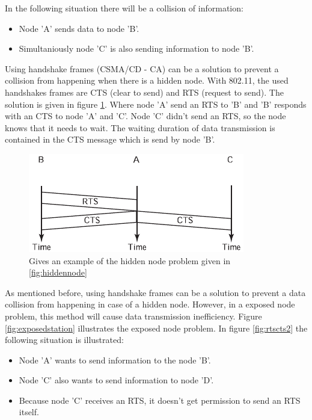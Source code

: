 \documentclass[10pt,a4paper]{article}
\begin{document}
In the following situation there will be a collision of information:
\begin{itemize}
\setlength\itemsep{0em}
\item Node 'A' sends data to node 'B'.
\item Simultaniously node 'C' is also sending information to node 'B'.
\end{itemize}

Using handshake frames (CSMA/CD - CA) can be a solution to prevent a collision from happening when there is a hidden node. With 802.11, the used handshakes frames are CTS (clear to send) and RTS (request to send). The solution is given in figure \ref{fig:rtscts}. Where node 'A' send an RTS to 'B' and 'B' responds with an CTS to node 'A' and 'C'. Node 'C' didn't send an RTS, so the node knows that it needs to wait. The waiting duration of data transmission is contained in the CTS message which is send by node 'B'. \cite{tcipbook}

\begin{figure}[H]
   \centering
   \includegraphics[width=.75\textwidth]{rtscts}
   \caption{Gives an example of the hidden node problem given in \ref{fig:hiddennode}}
   \label{fig:rtscts}
\end{figure}

As mentioned before, using handshake frames can be a solution to prevent a data collision from happening in case of a hidden node. However, in a exposed node problem, this method will cause data transmission inefficiency. \cite{tcipbook} Figure \ref{fig:exposedstation} illustrates the exposed node problem. In figure \ref{fig:rtscts2} the following situation is illustrated:

\begin{itemize}
\setlength\itemsep{0em}
\item Node 'A' wants to send information to the node 'B'.
\item Node 'C' also wants to send information to node 'D'.
\item Because node 'C' receives an RTS, it doesn't get permission to send an RTS itself.
\end{itemize}
\end{document}
